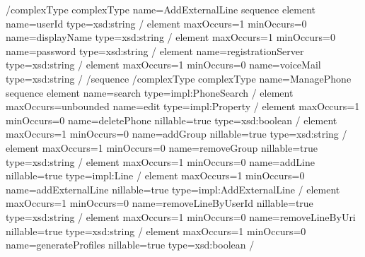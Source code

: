 \documentclass[letterpaper,10pt,english]{sphinxmanual}
\begin{document}
\begin{sphinxVerbatim}[commandchars=\\\{\}]
\PYGZlt{}/complexType\PYGZgt{}
\PYGZlt{}complexType name=\PYGZdq{}AddExternalLine\PYGZdq{}\PYGZgt{}
\PYGZlt{}sequence\PYGZgt{}
\PYGZlt{}element name=\PYGZdq{}userId\PYGZdq{} type=\PYGZdq{}xsd:string\PYGZdq{} /\PYGZgt{}
\PYGZlt{}element maxOccurs=\PYGZdq{}1\PYGZdq{} minOccurs=\PYGZdq{}0\PYGZdq{} name=\PYGZdq{}displayName\PYGZdq{} type=\PYGZdq{}xsd:string\PYGZdq{} /\PYGZgt{}
\PYGZlt{}element maxOccurs=\PYGZdq{}1\PYGZdq{} minOccurs=\PYGZdq{}0\PYGZdq{} name=\PYGZdq{}password\PYGZdq{} type=\PYGZdq{}xsd:string\PYGZdq{} /\PYGZgt{}
\PYGZlt{}element name=\PYGZdq{}registrationServer\PYGZdq{} type=\PYGZdq{}xsd:string\PYGZdq{} /\PYGZgt{}
\PYGZlt{}element maxOccurs=\PYGZdq{}1\PYGZdq{} minOccurs=\PYGZdq{}0\PYGZdq{} name=\PYGZdq{}voiceMail\PYGZdq{} type=\PYGZdq{}xsd:string\PYGZdq{} /\PYGZgt{}
\PYGZlt{}/sequence\PYGZgt{}
\PYGZlt{}/complexType\PYGZgt{}
\PYGZlt{}complexType name=\PYGZdq{}ManagePhone\PYGZdq{}\PYGZgt{}
\PYGZlt{}sequence\PYGZgt{}
\PYGZlt{}element name=\PYGZdq{}search\PYGZdq{} type=\PYGZdq{}impl:PhoneSearch\PYGZdq{} /\PYGZgt{}
\PYGZlt{}element maxOccurs=\PYGZdq{}unbounded\PYGZdq{} name=\PYGZdq{}edit\PYGZdq{} type=\PYGZdq{}impl:Property\PYGZdq{} /\PYGZgt{}
\PYGZlt{}element maxOccurs=\PYGZdq{}1\PYGZdq{} minOccurs=\PYGZdq{}0\PYGZdq{} name=\PYGZdq{}deletePhone\PYGZdq{} nillable=\PYGZdq{}true\PYGZdq{} type=\PYGZdq{}xsd:boolean\PYGZdq{} /\PYGZgt{}
\PYGZlt{}element maxOccurs=\PYGZdq{}1\PYGZdq{} minOccurs=\PYGZdq{}0\PYGZdq{} name=\PYGZdq{}addGroup\PYGZdq{} nillable=\PYGZdq{}true\PYGZdq{} type=\PYGZdq{}xsd:string\PYGZdq{} /\PYGZgt{}
\PYGZlt{}element maxOccurs=\PYGZdq{}1\PYGZdq{} minOccurs=\PYGZdq{}0\PYGZdq{} name=\PYGZdq{}removeGroup\PYGZdq{} nillable=\PYGZdq{}true\PYGZdq{} type=\PYGZdq{}xsd:string\PYGZdq{} /\PYGZgt{}
\PYGZlt{}element maxOccurs=\PYGZdq{}1\PYGZdq{} minOccurs=\PYGZdq{}0\PYGZdq{} name=\PYGZdq{}addLine\PYGZdq{} nillable=\PYGZdq{}true\PYGZdq{} type=\PYGZdq{}impl:Line\PYGZdq{} /\PYGZgt{}
\PYGZlt{}element maxOccurs=\PYGZdq{}1\PYGZdq{} minOccurs=\PYGZdq{}0\PYGZdq{} name=\PYGZdq{}addExternalLine\PYGZdq{} nillable=\PYGZdq{}true\PYGZdq{} type=\PYGZdq{}impl:AddExternalLine\PYGZdq{} /\PYGZgt{}
\PYGZlt{}element maxOccurs=\PYGZdq{}1\PYGZdq{} minOccurs=\PYGZdq{}0\PYGZdq{} name=\PYGZdq{}removeLineByUserId\PYGZdq{} nillable=\PYGZdq{}true\PYGZdq{} type=\PYGZdq{}xsd:string\PYGZdq{} /\PYGZgt{}
\PYGZlt{}element maxOccurs=\PYGZdq{}1\PYGZdq{} minOccurs=\PYGZdq{}0\PYGZdq{} name=\PYGZdq{}removeLineByUri\PYGZdq{} nillable=\PYGZdq{}true\PYGZdq{} type=\PYGZdq{}xsd:string\PYGZdq{} /\PYGZgt{}
\PYGZlt{}element maxOccurs=\PYGZdq{}1\PYGZdq{} minOccurs=\PYGZdq{}0\PYGZdq{} name=\PYGZdq{}generateProfiles\PYGZdq{} nillable=\PYGZdq{}true\PYGZdq{} type=\PYGZdq{}xsd:boolean\PYGZdq{} /\PYGZgt{}

\end{sphinxVerbatim}
\end{document}
